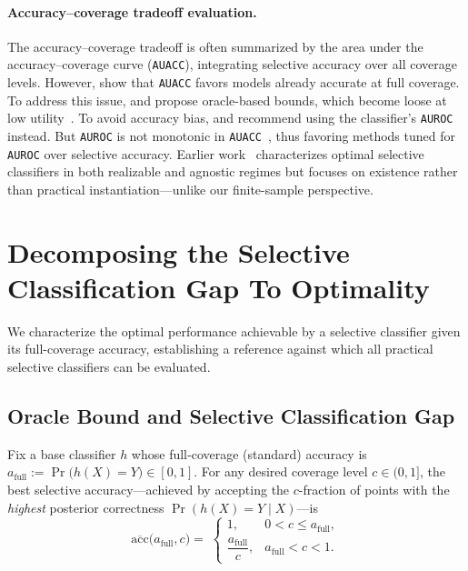 \paragraph{Accuracy–coverage tradeoff evaluation.}
The accuracy–coverage tradeoff is often summarized by the area under the accuracy–coverage curve (\texttt{AUACC}), integrating selective accuracy over all coverage levels. However, \citet{geifman2018bias} show that \texttt{AUACC} favors models already accurate at full coverage. To address this issue, \citet{geifman2018bias} and \citet{rabanser2023training} propose oracle-based bounds, which become loose at low utility~\citep{galil2023can}. To avoid accuracy bias, \citet{galil2023can} and \citet{pugnana2023auc} recommend using the classifier’s \texttt{AUROC} instead. But \texttt{AUROC} is not monotonic in \texttt{AUACC}~\citep{cattelan2023fix, ding2020revisiting}, thus favoring methods tuned for \texttt{AUROC} over selective accuracy. Earlier work~\citep{el2010foundations, wiener2011agnostic} characterizes optimal selective classifiers in both realizable and agnostic regimes but focuses on existence rather than practical instantiation—unlike our finite-sample perspective.

\section{Decomposing the Selective Classification Gap To Optimality}
\label{sec:methods}

We characterize the optimal performance achievable by a selective classifier given its full-coverage accuracy, establishing a reference against which all practical selective classifiers can be evaluated.

\subsection{Oracle Bound and Selective Classification Gap}

\begin{definition}
\label{def:poub}
Fix a base classifier \(h\) whose full‑coverage (standard) accuracy is
\(a_{\text{full}}:=\Pr\bigl(h(X)=Y\bigr)\in[0,1]\).
For any desired coverage level \(c\in(0,1]\), the best selective
accuracy—achieved by accepting the \(c\)-fraction of points with the \emph{highest}
posterior correctness $\Pr(h(X)=Y\mid X)$—is
\begin{equation}
\label{eq:bound}
\overline{\mathrm{acc}}\bigl(a_{\text{full}},c\bigr)
=\;
\begin{cases}
1, & 0 < c \le a_{\text{full}}, \\[6pt]
\dfrac{a_{\text{full}}}{c}, & a_{\text{full}} < c < 1.
\end{cases}
\end{equation}
\end{definition}

